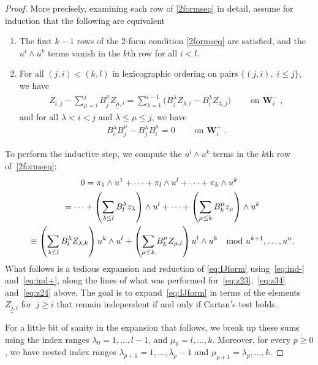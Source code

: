 \documentclass[pdftex]{sigma}
\numberwithin{equation}{section}
\DeclareMathOperator{\Wu}{\mathbf{W}}
\begin{document}
\begin{proof}
More precisely, examining each row of \eqref{2formseq} in detail, assume for induction that the following are equivalent
\begin{enumerate}\itemsep=0pt
\item The f\/irst $k-1$ rows of the 2-form condition
\eqref{2formseq} are satisf\/ied, and the $u^i \wedge u^k$ terms vanish in the
$k$th row for all $i < l$.
\item For all $(j,i)  < (k,l)$ in lexicographic ordering on
pairs $\{ (j,i),\; i \leq j\}$, we have
\begin{gather}
   Z_{i,j} - \sum_{\mu=i}^jB^{\mu}_{j} \underline{Z_{\mu,i}} = \sum_{\lambda=1}^{i-1} \big( B^{\lambda}_{j}
   Z_{\lambda,i} - B^{\lambda}_{i} Z_{\lambda,j}\big) \qquad \text{on $\Wu^-_i$},
   \label{eq:ind-}
\end{gather}
and for all $\lambda <i < j$ and $\lambda \leq \mu \leq j$, we have
\begin{gather}
B^\lambda_i B^\mu_j - B^\lambda_j B^\mu_i=0 \qquad \text{on $\Wu^+_i$}.
\label{eq:ind+}
\end{gather}
\end{enumerate}


To perform the inductive step, we compute the $u^l \wedge u^k$ terms in the $k$th row of~\eqref{2formseq}:
\begin{gather}
0  =  \pi_1 \wedge u^1 + \cdots + \pi_l \wedge u^l +\cdots+ \pi_k \wedge u^k \nonumber\\
 \hphantom{0}{}  = \cdots + \left( \sum_{\lambda \leq l} B^{\lambda}_l z_{\lambda}
  \right) \wedge u^l + \cdots +  \left( \sum_{\mu\leq k} B^\mu_k z_\mu\right) \wedge u^k \nonumber\\
 \hphantom{0}{}
 \equiv  \left( \sum_{\lambda \leq l} B^{\lambda}_l Z_{\lambda,k}
  \right) u^k \wedge u^l  +  \left( \sum_{\mu\leq k} B^\mu_k
  Z_{\mu,l}\right) u^l \wedge u^k \
  \mod u^{k+1}, \ldots, u^n.
\label{eq:IJform}
\end{gather}
What follows is a tedious expansion and reduction of \eqref{eq:IJform} using~\eqref{eq:ind-} and~\eqref{eq:ind+}, along
the lines of what was performed for~\eqref{eq:z23},~\eqref{eq:z34} and~\eqref{eq:z24} above.  The goal is to expand~\eqref{eq:IJform} in terms of
the elements~$\underline{Z_{j,i}}$ for~$j \geq i$ that remain independent if
and only if Cartan's test holds.

For a little bit of sanity in the expansion that follows, we break up these
sums using the index ranges $\lambda_0 = 1, \ldots, l-1$, and $\mu_0 = l,
\ldots, k$.  Moreover, for every $p\geq 0$, we have nested index ranges $\lambda_{p+1}
= 1, \ldots, \lambda_{p}-1$ and $\mu_{p+1} = \lambda_p, \ldots, k$.


\end{proof}
\end{document}
